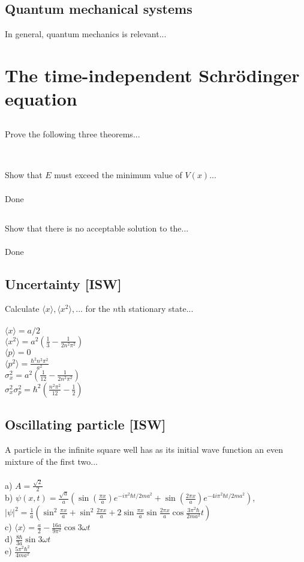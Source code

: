 \documentclass{article}
\newcommand{\<}{\langle}
\renewcommand{\>}{\rangle}
\begin{document}
\subsection{Quantum mechanical systems}
In general, quantum mechanics is relevant...

\section{The time-independent Schr\"odinger equation}

\subsection{}
Prove the following three theorems...
\\ \\
\subsection{}
Show that $E$ must exceed the minimum value of $V(x)$...
\\ \\
Done
\subsection{}
Show that there is no acceptable solution to the...
\\ \\
Done
\subsection{Uncertainty [ISW]}
Calculate $\<x\>, \<x^2\>,...$ for the $n$th stationary state...
\\ \\
$\<x\> = a/2$ \\
$\<x^2\> = a^2 \left( \frac{1}{3} - \frac{1}{2n^2\pi^2} \right)$ \\
$\<p\> = 0$ \\
$\<p^2\> = \frac{\hbar^2 n^2 \pi^2}{a^2} $ \\
$\sigma_x^2 = a^2 \left( \frac{1}{12} - \frac{1}{2n^2\pi^2} \right) $ \\
$\sigma_x^2 \sigma_p^2 = \hbar^2 \left( \frac{n^2 \pi^2}{12} - \frac{1}{2} \right)$

\subsection{Oscillating particle [ISW]}
A particle in the infinite square well has as its initial wave function an even mixture of the first two...
\\ \\
a) $A = \frac{\sqrt 2}{2}$ \\
b) $\psi(x,t) = \frac{\sqrt a}{a} \left(\sin(\frac{\pi x}{a}) e^{-i\pi^2\hbar t/ 2ma^2} + \sin(\frac{2\pi x}{a})e^{-4i\pi^2\hbar t / 2ma^2}\right)$,
$|\psi|^2 = \frac{1}{a} \left( \sin^2\frac{\pi x}{a} + \sin^2\frac{2\pi x}{a} + 2\sin\frac{\pi x}{a}\sin\frac{2\pi x}{a}\cos\frac{3\pi^2\hbar}{2ma^2}t  \right)$ \\
c) $\<x\> = \frac{a}{2} - \frac{16a}{9\pi^2} \cos 3\omega t$ \\
d) $\frac{8\hbar}{3a} \sin 3\omega t$ \\
e) $\frac{5\pi^2\hbar^2}{4ma^2}$
\end{document}
